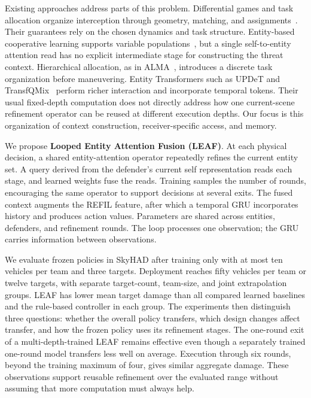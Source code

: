 Existing approaches address parts of this problem. Differential games and task allocation organize interception through geometry, matching, and assignments~\cite{chen2017reachavoid,yan2020barriers,shishika2020perimeter}. Their guarantees rely on the chosen dynamics and task structure. Entity-based cooperative learning supports variable populations~\cite{iqbal2021refil,park2026spectra}, but a single self-to-entity attention read has no explicit intermediate stage for constructing the threat context. Hierarchical allocation, as in ALMA~\cite{iqbal2022alma}, introduces a discrete task organization before maneuvering. Entity Transformers such as UPDeT and TransfQMix~\cite{hu2021updet,transfqmix2023} perform richer interaction and incorporate temporal tokens. Their usual fixed-depth computation does not directly address how one current-scene refinement operator can be reused at different execution depths. Our focus is this organization of context construction, receiver-specific access, and memory.

We propose \textbf{Looped Entity Attention Fusion (LEAF)}. At each physical decision, a shared entity-attention operator repeatedly refines the current entity set. A query derived from the defender's current self representation reads each stage, and learned weights fuse the reads. Training samples the number of rounds, encouraging the same operator to support decisions at several exits. The fused context augments the REFIL feature, after which a temporal GRU incorporates history and produces action values. Parameters are shared across entities, defenders, and refinement rounds. The loop processes one observation; the GRU carries information between observations.

We evaluate frozen policies in SkyHAD after training only with at most ten vehicles per team and three targets. Deployment reaches fifty vehicles per team or twelve targets, with separate target-count, team-size, and joint extrapolation groups. LEAF has lower mean target damage than all compared learned baselines and the rule-based controller in each group. The experiments then distinguish three questions: whether the overall policy transfers, which design changes affect transfer, and how the frozen policy uses its refinement stages. The one-round exit of a multi-depth-trained LEAF remains effective even though a separately trained one-round model transfers less well on average. Execution through six rounds, beyond the training maximum of four, gives similar aggregate damage. These observations support reusable refinement over the evaluated range without assuming that more computation must always help.

